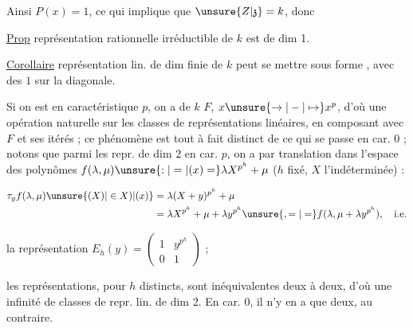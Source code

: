 
Ainsi $P(x)=1$, ce qui implique que $\unsure{Z|\mathfrak z}=k$, donc

\uline{Prop}  représentation  rationnelle irréductible de $k$ est de dim 1.

\uline{Corollaire}  représentation lin.  de dim finie de $k$ peut se mettre sous forme , avec des $1$ sur la diagonale.

Si on est en caractéristique $p$, on a    de $k$  $F$, $x\unsure{\to|-|\mapsto}x^p$,  d'où une opération naturelle sur les classes de représentations linéaires, en composant avec $F$ et ses itérés ; ce phénomène est tout à fait distinct de ce qui se passe en car. 0 ; notons que parmi les repr. de dim 2 en car. $p$, on a   par  translation dans l'espace des polynômes $f(\lambda,\mu)\unsure{:|=|(x)=}\lambda X^{p^h}+\mu$ ($h$ fixé, $X$ l'indéterminée) :

\[\begin{aligned}\tau_y f(\lambda,\mu)\unsure{(X)|\in X)|(x)} &= \lambda(X+y)^{p^h}+\mu\\ &=\lambda X^{p^h}+\mu+\lambda y^{p^h}\unsure{,=|=}f(\lambda,\mu+\lambda y^{p^h}),\quad \text{i.e.}\end{aligned}\]

la représentation $E_h(y)=\begin{pmatrix}1&y^{p^h}\\0&1\end{pmatrix}$ ;

les représentations, pour   $h$ distincts, sont inéquivalentes deux à deux, d'où une infinité de classes de repr. lin. de dim 2. En car. 0, il n'y en a que deux, au contraire.

